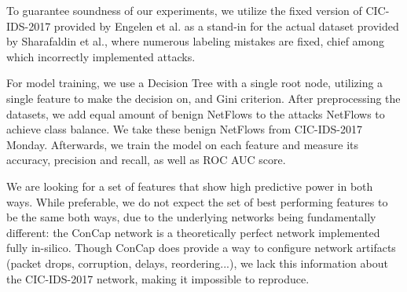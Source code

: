 \documentclass[conference]{IEEEtran}
\begin{document}
	To guarantee soundness of our experiments, we utilize the fixed version of CIC-IDS-2017 provided by Engelen et al. \cite{troubleshooting_cic2017} as a stand-in for the actual dataset provided by Sharafaldin et al., where numerous labeling mistakes are fixed, chief among which incorrectly implemented attacks.
	
	For model training, we use a Decision Tree with a single root node, utilizing a single feature to make the decision on, and Gini criterion. After preprocessing the datasets, we add equal amount of benign NetFlows to the attacks NetFlows to achieve class balance. We take these benign NetFlows from CIC-IDS-2017 Monday. Afterwards, we train the model on each feature and measure its accuracy, precision and recall, as well as ROC AUC score. 
	
	We are looking for a set of features that show high predictive power in both ways. While preferable, we do not expect the set of best performing features to be the same both ways, due to the underlying networks being fundamentally different: the ConCap network is a theoretically perfect network implemented fully in-silico. Though ConCap does provide a way to configure network artifacts (packet drops, corruption, delays, reordering...), we lack this information about the CIC-IDS-2017 network, making it impossible to reproduce.
	
\end{document}

